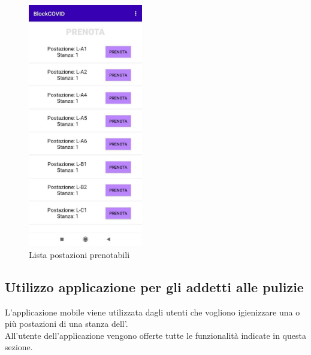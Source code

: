 	\begin{figure}[H]
		\centering
		\includegraphics[width=5cm]{res/images/ListaPostazioniDaPrenotare.png}
		\caption{Lista postazioni prenotabili}
	\end{figure}
	
	
	\subsection{Utilizzo applicazione per gli addetti alle pulizie}
	L'applicazione mobile viene utilizzata dagli utenti che vogliono igienizzare una o più postazioni di una stanza dell'. 
	\\All'utente dell'applicazione vengono offerte tutte le funzionalità indicate in questa sezione.
